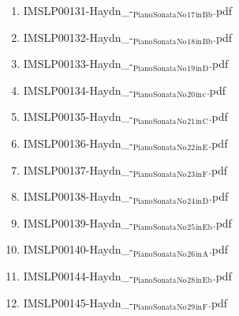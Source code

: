 \documentclass[11pt]{article}
\begin{document}
\begin{enumerate}
\begin{enumerate}
\item IMSLP00131-Haydn\_-$_{\text{Piano}}$$_{\text{Sonata}}$$_{\text{No}}$$_{\text{17}}$$_{\text{in}}$$_{\text{Bb}}$.pdf
\label{sec-1-1-1-1-44-38-4-16}

\item IMSLP00132-Haydn\_-$_{\text{Piano}}$$_{\text{Sonata}}$$_{\text{No}}$$_{\text{18}}$$_{\text{in}}$$_{\text{Bb}}$.pdf
\label{sec-1-1-1-1-44-38-4-17}

\item IMSLP00133-Haydn\_-$_{\text{Piano}}$$_{\text{Sonata}}$$_{\text{No}}$$_{\text{19}}$$_{\text{in}}$$_{\text{D}}$.pdf
\label{sec-1-1-1-1-44-38-4-18}

\item IMSLP00134-Haydn\_-$_{\text{Piano}}$$_{\text{Sonata}}$$_{\text{No}}$$_{\text{20}}$$_{\text{in}}$$_{\text{c}}$.pdf
\label{sec-1-1-1-1-44-38-4-19}

\item IMSLP00135-Haydn\_-$_{\text{Piano}}$$_{\text{Sonata}}$$_{\text{No}}$$_{\text{21}}$$_{\text{in}}$$_{\text{C}}$.pdf
\label{sec-1-1-1-1-44-38-4-20}

\item IMSLP00136-Haydn\_-$_{\text{Piano}}$$_{\text{Sonata}}$$_{\text{No}}$$_{\text{22}}$$_{\text{in}}$$_{\text{E}}$.pdf
\label{sec-1-1-1-1-44-38-4-21}

\item IMSLP00137-Haydn\_-$_{\text{Piano}}$$_{\text{Sonata}}$$_{\text{No}}$$_{\text{23}}$$_{\text{in}}$$_{\text{F}}$.pdf
\label{sec-1-1-1-1-44-38-4-22}

\item IMSLP00138-Haydn\_-$_{\text{Piano}}$$_{\text{Sonata}}$$_{\text{No}}$$_{\text{24}}$$_{\text{in}}$$_{\text{D}}$.pdf
\label{sec-1-1-1-1-44-38-4-23}

\item IMSLP00139-Haydn\_-$_{\text{Piano}}$$_{\text{Sonata}}$$_{\text{No}}$$_{\text{25}}$$_{\text{in}}$$_{\text{Eb}}$.pdf
\label{sec-1-1-1-1-44-38-4-24}

\item IMSLP00140-Haydn\_-$_{\text{Piano}}$$_{\text{Sonata}}$$_{\text{No}}$$_{\text{26}}$$_{\text{in}}$$_{\text{A}}$.pdf
\label{sec-1-1-1-1-44-38-4-25}

\item IMSLP00144-Haydn\_-$_{\text{Piano}}$$_{\text{Sonata}}$$_{\text{No}}$$_{\text{28}}$$_{\text{in}}$$_{\text{Eb}}$.pdf
\label{sec-1-1-1-1-44-38-4-26}

\item IMSLP00145-Haydn\_-$_{\text{Piano}}$$_{\text{Sonata}}$$_{\text{No}}$$_{\text{29}}$$_{\text{in}}$$_{\text{F}}$.pdf
\label{sec-1-1-1-1-44-38-4-27}


\end{enumerate}
\end{enumerate}
\end{document}
